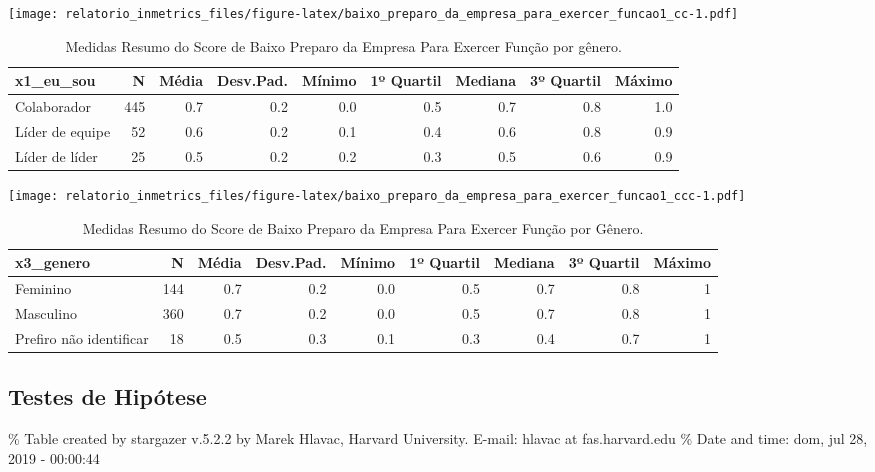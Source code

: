 \documentclass[]{book}
\begin{document}
\texttt{[image: relatorio\_inmetrics\_files/figure-latex/baixo\_preparo\_da\_empresa\_para\_exercer\_funcao1\_cc-1.pdf]}

\begin{table}[t]

\caption{\label{tab:unnamed-chunk-19}Medidas Resumo do Score de Baixo Preparo da Empresa Para Exercer Função por gênero.}
\centering
\fontsize{7}{9}\selectfont
\begin{tabular}{lrrrrrrrr}
\toprule
x1\_eu\_sou & N & Média & Desv.Pad. & Mínimo & 1º Quartil & Mediana & 3º Quartil & Máximo\\
\midrule
Colaborador & 445 & 0.7 & 0.2 & 0.0 & 0.5 & 0.7 & 0.8 & 1.0\\
Líder de equipe & 52 & 0.6 & 0.2 & 0.1 & 0.4 & 0.6 & 0.8 & 0.9\\
Líder de líder & 25 & 0.5 & 0.2 & 0.2 & 0.3 & 0.5 & 0.6 & 0.9\\
\bottomrule
\end{tabular}
\end{table}

\texttt{[image: relatorio\_inmetrics\_files/figure-latex/baixo\_preparo\_da\_empresa\_para\_exercer\_funcao1\_ccc-1.pdf]}

\begin{table}[t]

\caption{\label{tab:unnamed-chunk-20}Medidas Resumo do Score de Baixo Preparo da Empresa Para Exercer Função por Gênero.}
\centering
\fontsize{7}{9}\selectfont
\begin{tabular}{lrrrrrrrr}
\toprule
x3\_genero & N & Média & Desv.Pad. & Mínimo & 1º Quartil & Mediana & 3º Quartil & Máximo\\
\midrule
Feminino & 144 & 0.7 & 0.2 & 0.0 & 0.5 & 0.7 & 0.8 & 1\\
Masculino & 360 & 0.7 & 0.2 & 0.0 & 0.5 & 0.7 & 0.8 & 1\\
Prefiro não identificar & 18 & 0.5 & 0.3 & 0.1 & 0.3 & 0.4 & 0.7 & 1\\
\bottomrule
\end{tabular}
\end{table}

\pagebreak

\hypertarget{testes-de-hipotese-4}{%
\subsection{Testes de Hipótese}\label{testes-de-hipotese-4}}

\% Table created by stargazer v.5.2.2 by Marek Hlavac, Harvard University. E-mail: hlavac at fas.harvard.edu
\% Date and time: dom, jul 28, 2019 - 00:00:44
\end{document}
